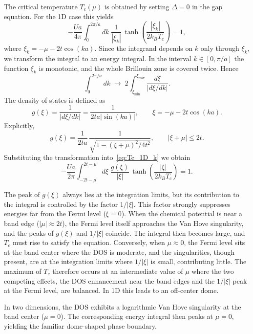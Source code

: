 \documentclass[11pt,a4paper,twoside,openany]{report}
\begin{document}
The critical temperature \(T_c(\mu)\) is obtained by setting \(\Delta=0\) in the gap equation.  For the 1D case this yields
\begin{equation}
-\frac{U a}{4\pi}\int_{0}^{2\pi/a}\!\!dk\;
\frac{1}{|\xi_k|}\,\tanh\!\left(\frac{|\xi_k|}{2k_{B}T_c}\right)=1 ,
\label{eq:Tc_1D_k}
\end{equation}
where \(\xi_k = -\mu-2t\cos(ka)\). Since the integrand depends on \(k\) only through \(\xi_k\), we transform the integral
to an energy integral.  In the interval \(k\in[0,\pi/a]\) the function \(\xi_k\) is monotonic, and the whole Brillouin zone
is covered twice. Hence
\[
\int_{0}^{2\pi/a}\!\!dk \;\longrightarrow\; 2\int_{\xi_{\min}}^{\xi_{\max}} \frac{d\xi}{|d\xi/dk|}.
\]
The density of states is defined as
\[
g(\xi) = \frac{1}{|d\xi/dk|} = \frac{1}{2ta|\sin(ka)|},\qquad
\xi = -\mu-2t\cos(ka) .
\]
Explicitly,
\[
g(\xi) = \frac{1}{2 t a}\,\frac{1}{\sqrt{1-(\xi+\mu)^2/4t^2}},\qquad |\xi+\mu|\leq 2t .
\]
Substituting the transformation into~\eqref{eq:Tc_1D_k} we obtain
\begin{equation}
-\frac{U a}{2\pi}\int_{-2t-\mu}^{2t-\mu}\!\!d\xi\;
\frac{g(\xi)}{|\xi|}\,\tanh\!\left(\frac{|\xi|}{2k_{B}T_c}\right)=1 .
\label{eq:Tc_1D_DOS}
\end{equation}

The peak of \(g(\xi)\) always lies at the integration limits, but its contribution to the integral is controlled by the factor \(1/|\xi|\). This factor strongly suppresses energies far from the Fermi level (\(\xi=0\)). When the chemical potential is near a band edge (\(|\mu|\approx 2t\)), the Fermi level itself approaches the Van Hove singularity, and the peaks of \(g(\xi)\) and \(1/|\xi|\) coincide. The integral then becomes large, and \(T_c\) must rise to satisfy the equation. Conversely, when \(\mu\approx 0\), the Fermi level sits at the band center where the DOS is moderate, and the singularities, though present, are at the integration limits where \(1/|\xi|\) is small, contributing little.  The maximum of \(T_c\) therefore occurs at an intermediate value of \(\mu\) where the two competing effects, the DOS enhancement near the band edges and the \(1/|\xi|\) peak at the Fermi level, are balanced. In 1D this leads to an off-center dome.
  


In two dimensions, the DOS exhibits a logarithmic Van Hove singularity at the band center (\(\mu=0\)). The corresponding energy integral then peaks at \(\mu=0\), yielding the familiar dome-shaped phase boundary.
\end{document}
